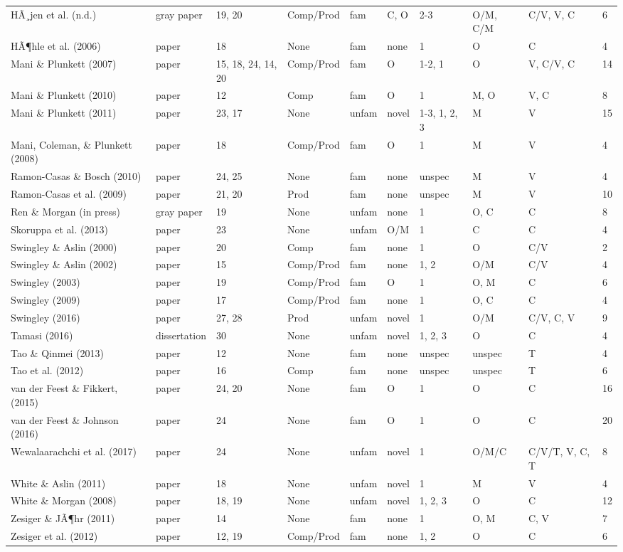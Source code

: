 \documentclass[man]{apa6}
\newenvironment{lltable}{\begin{landscape}\begin{center}\begin{ThreePartTable}}{\end{ThreePartTable}\end{center}\end{landscape}}
\begin{document}
\begin{lltable}
{\begin{longtable}{llllllllll}
HÃ¸jen et al. (n.d.) & gray paper & 19, 20 & Comp/Prod & fam & C, O & 2-3 & O/M, C/M & C/V, V, C & 6\\
HÃ¶hle et al. (2006) & paper & 18 & None & fam & none & 1 & O & C & 4\\
Mani \& Plunkett (2007) & paper & 15, 18, 24, 14, 20 & Comp/Prod & fam & O & 1-2, 1 & O & V, C/V, C & 14\\
Mani \& Plunkett (2010) & paper & 12 & Comp & fam & O & 1 & M, O & V, C & 8\\
Mani \& Plunkett (2011) & paper & 23, 17 & None & unfam & novel & 1-3, 1, 2, 3 & M & V & 15\\
Mani, Coleman, \& Plunkett (2008) & paper & 18 & Comp/Prod & fam & O & 1 & M & V & 4\\
Ramon-Casas \& Bosch (2010) & paper & 24, 25 & None & fam & none & unspec & M & V & 4\\
Ramon-Casas et al. (2009) & paper & 21, 20 & Prod & fam & none & unspec & M & V & 10\\
Ren \& Morgan (in press) & gray paper & 19 & None & unfam & none & 1 & O, C & C & 8\\
Skoruppa et al. (2013) & paper & 23 & None & unfam & O/M & 1 & C & C & 4\\
Swingley \& Aslin (2000) & paper & 20 & Comp & fam & none & 1 & O & C/V & 2\\
Swingley \& Aslin (2002) & paper & 15 & Comp/Prod & fam & none & 1, 2 & O/M & C/V & 4\\
Swingley (2003) & paper & 19 & Comp/Prod & fam & O & 1 & O, M & C & 6\\
Swingley (2009) & paper & 17 & Comp/Prod & fam & none & 1 & O, C & C & 4\\
Swingley (2016) & paper & 27, 28 & Prod & unfam & novel & 1 & O/M & C/V, C, V & 9\\
Tamasi (2016) & dissertation & 30 & None & unfam & novel & 1, 2, 3 & O & C & 4\\
Tao \& Qinmei (2013) & paper & 12 & None & fam & none & unspec & unspec & T & 4\\
Tao et al. (2012) & paper & 16 & Comp & fam & none & unspec & unspec & T & 6\\
van der Feest \& Fikkert, (2015) & paper & 24, 20 & None & fam & O & 1 & O & C & 16\\
van der Feest \& Johnson (2016) & paper & 24 & None & fam & O & 1 & O & C & 20\\
Wewalaarachchi et al. (2017) & paper & 24 & None & unfam & novel & 1 & O/M/C & C/V/T, V, C, T & 8\\
White \& Aslin (2011) & paper & 18 & None & unfam & novel & 1 & M & V & 4\\
White \& Morgan (2008) & paper & 18, 19 & None & unfam & novel & 1, 2, 3 & O & C & 12\\
Zesiger \& JÃ¶hr (2011) & paper & 14 & None & fam & none & 1 & O, M & C, V & 7\\
Zesiger et al. (2012) & paper & 12, 19 & Comp/Prod & fam & none & 1, 2 & O & C & 6\\
\bottomrule
\end{longtable}
}
\end{lltable}
\end{document}
